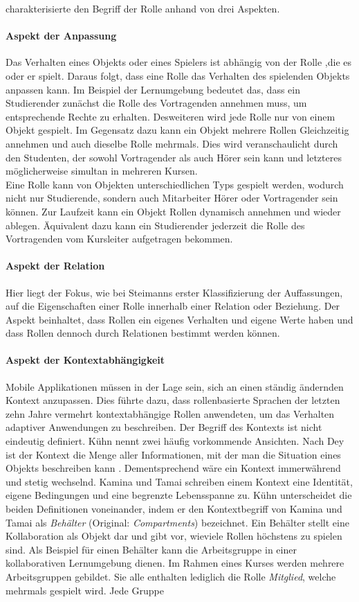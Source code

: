 \documentclass[conference]{IEEEtran}
\begin{document}
charakterisierte den Begriff der Rolle anhand von drei Aspekten\cite{family}. \paragraph{Aspekt der Anpassung} Das Verhalten eines Objekts oder eines Spielers ist abhängig von der Rolle ,die es oder er spielt. Daraus folgt, dass eine Rolle das Verhalten des spielenden Objekts anpassen kann. Im Beispiel der Lernumgebung bedeutet das, dass ein Studierender zunächst die Rolle des Vortragenden annehmen muss, um entsprechende Rechte zu erhalten. Desweiteren wird jede Rolle nur von einem Objekt gespielt. Im Gegensatz dazu kann ein Objekt mehrere Rollen Gleichzeitig annehmen und auch dieselbe Rolle mehrmals. Dies wird veranschaulicht durch den Studenten, der sowohl Vortragender als auch Hörer sein kann und letzteres möglicherweise simultan in mehreren Kursen.\\ Eine Rolle kann von Objekten unterschiedlichen Typs gespielt werden, wodurch nicht nur Studierende, sondern auch Mitarbeiter Hörer oder Vortragender sein können. Zur Laufzeit kann ein Objekt Rollen dynamisch annehmen und wieder ablegen. Äquivalent dazu kann ein Studierender jederzeit die Rolle des Vortragenden vom Kursleiter aufgetragen bekommen.\paragraph{Aspekt der Relation} Hier liegt der Fokus, wie bei Steimanns erster Klassifizierung der Auffassungen, auf die Eigenschaften einer Rolle innerhalb einer Relation oder Beziehung. Der Aspekt beinhaltet, dass Rollen ein eigenes Verhalten und eigene Werte haben und dass Rollen dennoch durch Relationen bestimmt werden können.  \paragraph{Aspekt der Kontextabhängigkeit} Mobile Applikationen müssen in der Lage sein, sich an einen ständig ändernden Kontext anzupassen. Dies führte dazu, dass rollenbasierte Sprachen der letzten zehn Jahre vermehrt kontextabhängige Rollen anwendeten, um das Verhalten adaptiver Anwendungen zu beschreiben. Der Begriff des Kontexts ist nicht eindeutig definiert. Kühn nennt zwei häufig vorkommende Ansichten. Nach Dey ist der Kontext die Menge aller Informationen, mit der man die Situation eines Objekts beschreiben kann \cite{dey2001understanding}. Dementsprechend wäre ein Kontext immerwährend und stetig wechselnd. Kamina und Tamai schreiben einem Kontext eine Identität, eigene Bedingungen und eine begrenzte Lebensspanne zu\cite{kamai2005selective}. Kühn unterscheidet die beiden Definitionen voneinander, indem er den Kontextbegriff von Kamina und Tamai als \textit{Behälter} (Original: \textit{Compartments}) bezeichnet. Ein Behälter stellt eine Kollaboration als Objekt dar und gibt vor, wieviele Rollen höchstens zu spielen sind. Als Beispiel für einen Behälter kann die Arbeitsgruppe in einer kollaborativen Lernumgebung dienen. Im Rahmen eines Kurses werden mehrere Arbeitsgruppen gebildet. Sie alle enthalten lediglich die Rolle \textit{Mitglied}, welche mehrmals gespielt wird. Jede Gruppe 
\end{document}
